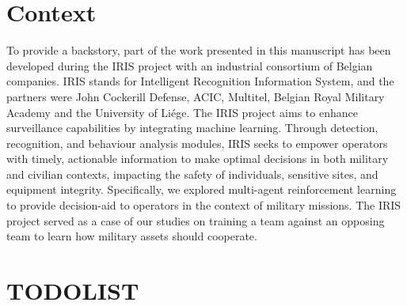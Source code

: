 \section{Context}
\label{sec:ch1_context}
To provide a backstory, part of the work presented in this manuscript has been developed during the IRIS project with an industrial consortium of Belgian companies.
IRIS stands for Intelligent Recognition Information System, and the partners were John Cockerill Defense, ACIC, Multitel, Belgian Royal Military Academy and the University of Li{\'{e}}ge.
The IRIS project aims to enhance surveillance capabilities by integrating machine learning.
Through detection, recognition, and behaviour analysis modules, IRIS seeks to empower operators with timely, actionable information to make optimal decisions in both military and civilian contexts, impacting the safety of individuals, sensitive sites, and equipment integrity.
Specifically, we explored multi-agent reinforcement learning to provide decision-aid to operators in the context of military missions.
The IRIS project served as a case of our studies on training a team against an opposing team to learn how military assets should cooperate.

\newpage
\section{TODOLIST}









